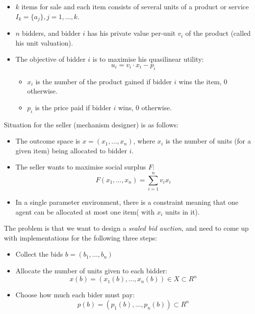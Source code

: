 \begin{itemize}
  \item $k$ items for sale and each item consists of several units of a product or service $I_k = \{a_j\}, j = 1, \dots, k$.
  \item $n$ bidders, and bidder $i$ has his private value per-unit $v_i$ of the 
  product (called his unit valuation).
  \item The objective of bidder $i$ is to maximise his quasilinear utility:
  \[
    u_i = v_i \cdot x_i - p_i
  \]
  \begin{itemize}
    \item $x_i$ is the number of the product gained if bidder $i$ wins the item,
    0 otherwise.
    \item $p_i$ is the price paid if bidder $i$ wins, 0 otherwise.
  \end{itemize}
\end{itemize}

Situation for the seller (mechanism designer) is as follows:

\begin{itemize}
  \item The outcome space is $x = (x_1, \dots, x_n)$, where $x_i$ is the number
  of units (for a given item) being allocated to bidder $i$.
  \item The seller wants to maximise social surplus $F$:
  \[
    F(x_1, \dots, x_n) = \sum\limits^n_{i=1} v_ix_i
  \]
  \item In a single parameter environment, there is a constraint meaning that
  one agent can be allocated at most one item( with $x_i$ units in it).
\end{itemize}

The problem is that we want to design a \textit{sealed bid auction}, and need
to come up with implementations for the following three steps:

\begin{itemize}
  \item Collect the bids $b=(b_1, \dots, b_n)$
  \item Allocate the number of units given to each bidder:
  \[
    x(b) = (x_1(b), \dots, x_n(b)) \in X \subset R^n
  \]
  \item Choose how much each bider must pay:
  \[
    p(b) = (p_1(b), \dots, p_n(b)) \subset R^n
  \]
\end{itemize}

